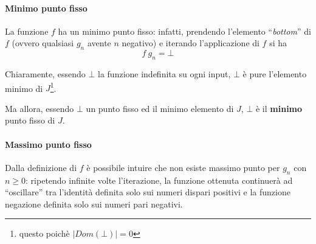 \paragraph{Minimo punto fisso}
La funzione $f$ ha un minimo punto fisso: infatti, prendendo l'elemento
``\textit{bottom}'' di $f$ (ovvero qualsiasi $g_n$ avente $n$ negativo) e
iterando l'applicazione di $f$ si ha
$$
f\ g_n = \bot
$$

Chiaramente, essendo $\bot$ la funzione indefinita su ogni input, $\bot$ è pure
l'elemento minimo di $J$\footnote{questo poichè $|Dom(\bot)| = 0$}.

Ma allora, essendo $\bot$ un punto fisso ed il minimo elemento di $J$, $\bot$ è
il \textbf{minimo} punto fisso di $J$.

\paragraph{Massimo punto fisso} Dalla definizione di $f$ è possibile intuire
che non esiste massimo punto per $g_n$ con $n \geq 0$: ripetendo infinite volte
l'iterazione, la funzione ottenuta continuerà ad ``oscillare'' tra l'identità
definita solo sui numeri dispari positivi e la funzione negazione definita solo
sui numeri pari negativi.

\undef{\lt}
